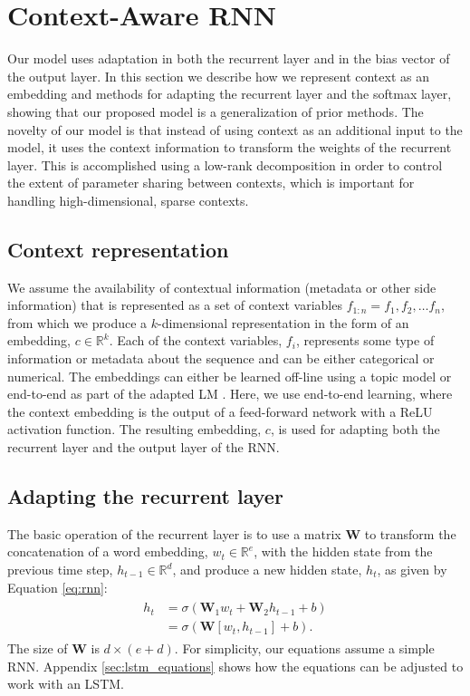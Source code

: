 \section{Context-Aware RNN}
\label{sec:model}

Our model uses adaptation in both the recurrent layer and in the bias vector of the output layer. In this section we describe how we represent context as an embedding 
and methods for adapting the recurrent layer and the softmax layer, showing that our proposed model is a generalization of prior methods. 
The novelty of our model is that instead of using context as an additional input to the model, it uses the context information to transform the weights of the recurrent layer. This is accomplished using a low-rank decomposition in order to control the extent of parameter sharing between contexts,
which is important for handling high-dimensional, sparse contexts.

\subsection{Context representation}

We assume the availability of contextual information (metadata or other side information) that is represented as a set of
context variables $f_{1:n}=f_1, f_2, \dots f_n$, from which we produce a $k$-dimensional representation in the form of an embedding, $c \in \mathbb{R}^k$. Each of the context variables, $f_i$, represents some type of information or metadata about the sequence and can be either categorical or numerical. The embeddings can either be learned off-line using a topic model \cite{mikolov2012context} or end-to-end as part of the adapted LM \cite{TangContextAware}.  Here, we use end-to-end learning, where the context embedding is the output of a feed-forward network with a ReLU activation function.
The resulting embedding, $c$, is used for adapting both the recurrent layer and the output layer of the RNN. 

\subsection{Adapting the recurrent layer}

The basic operation of the recurrent layer is to use a matrix $\mathbf{W}$ to transform the concatenation of a word embedding, $w_t \in \mathbb{R}^e$, with the hidden state from the previous time step, $h_{t-1} \in \mathbb{R}^d$, and produce a new hidden state, $h_t$, as given by Equation \ref{eq:rnn}:  
\begin{align}
\label{eq:rnn}
\begin{split}
h_t &= \sigma(\mathbf{W}_1 w_t + \mathbf{W}_2 h_{t-1} + b) \\
    &= \sigma(\mathbf{W}[w_t, h_{t-1}] + b).
\end{split}
\end{align}
The size of $\mathbf{W}$ is $d\times (e+d)$. For simplicity, our equations assume a simple RNN. Appendix \ref{sec:lstm_equations} shows how the equations can be adjusted to work with an LSTM. 

